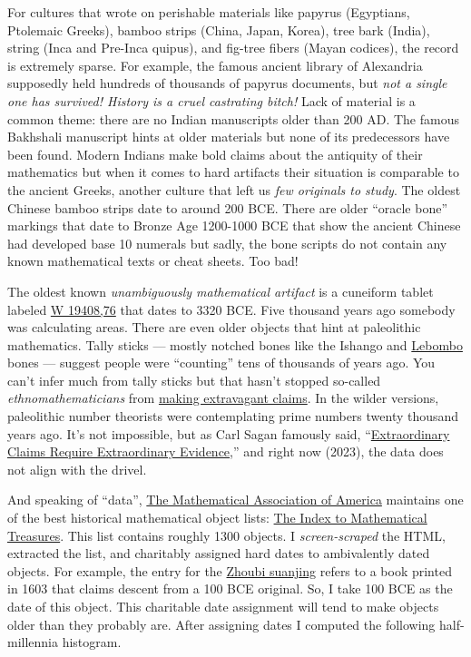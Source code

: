 For cultures that wrote on perishable materials like papyrus (Egyptians,
Ptolemaic Greeks), bamboo strips (China, Japan, Korea), tree bark
(India), string (Inca and Pre-Inca quipus), and fig-tree fibers (Mayan
codices), the record is extremely sparse. For example, the famous
ancient library of Alexandria supposedly held hundreds of thousands of
papyrus documents, but \emph{not a single one has survived! History is a
cruel castrating bitch!} Lack of material is a common theme: there are
no Indian manuscripts older than 200 AD. The famous Bakhshali manuscript
hints at older materials but none of its predecessors have been found.
Modern Indians make bold claims about the antiquity of their mathematics
but when it comes to hard artifacts their situation is comparable to the
ancient Greeks, another culture that left us \emph{few originals to
study}. The oldest Chinese bamboo strips date to around 200 BCE. There
are older ``oracle bone'' markings that date to Bronze Age 1200-1000 BCE
that show the ancient Chinese had developed base 10 numerals but sadly,
the bone scripts do not contain any known mathematical texts or cheat
sheets. Too bad!

The oldest known \emph{unambiguously mathematical artifact} is a
cuneiform tablet labeled
\href{https://cdli.mpiwg-berlin.mpg.de/artifacts/3118}{W 19408,76} that
dates to 3320 BCE. Five thousand years ago somebody was calculating
areas. There are even older objects that hint at paleolithic
mathematics. Tally sticks --- mostly notched bones like the Ishango and
\href{https://www.pnas.org/doi/full/10.1073/pnas.1204213109}{Lebombo}
bones --- suggest people were ``counting'' tens of thousands of years
ago. You can't infer much from tally sticks but that hasn't stopped
so-called \emph{ethnomathematicians} from
\href{https://afrolegends.com/2013/08/29/the-ishango-bone-craddle-of-mathematics/}{making
extravagant claims}. In the wilder versions, paleolithic number
theorists were contemplating prime numbers twenty thousand years ago.
It's not impossible, but as Carl Sagan famously said,
``\href{https://effectiviology.com/sagan-standard-extraordinary-claims-require-extraordinary-evidence/}{Extraordinary
Claims Require Extraordinary Evidence},'' and right now (2023), the data
does not align with the drivel.

And speaking of ``data'', \href{https://www.maa.org/}{The Mathematical
Association of America} maintains one of the best historical
mathematical object lists:
\href{https://www.maa.org/press/periodicals/convergence/index-to-mathematical-treasures}{The
Index to Mathematical Treasures}. This list contains roughly 1300
objects. I \emph{screen-scraped} the HTML, extracted the list, and
charitably assigned hard dates to ambivalently dated objects. For
example, the entry for the
\href{https://www.maa.org/press/periodicals/convergence/mathematical-treasures-zhoubi-suanjing}{Zhoubi
suanjing} refers to a book printed in 1603 that claims descent from a
100 BCE original. So, I take 100 BCE as the date of this object. This
charitable date assignment will tend to make objects older than they
probably are. After assigning dates I computed the following
half-millennia histogram.

